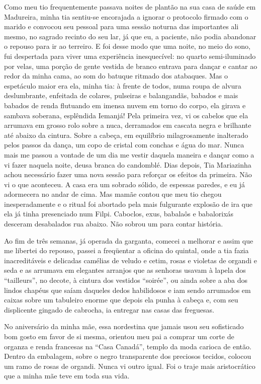 Como meu tio frequentemente passava noites de plantão na sua casa de saúde em Madureira, minha tia sentiu-se encorajada a ignorar o protocolo firmado com o marido e convocou seu pessoal para uma sessão noturna das importantes ali mesmo, no sagrado recinto do seu lar, já que eu, a paciente, não podia abandonar o repouso para ir ao terreiro.
E foi desse modo que uma noite, no meio do sono, fui despertada para viver uma experiência inesquecível: no quarto semi-iluminado por velas, uma porção de gente vestida de branco entrava para dançar e cantar ao redor da minha cama, ao som do batuque ritmado dos atabaques.
Mas o espetáculo maior era ela, minha tia: à frente de todos, numa roupa de alvura deslumbrante, enfeitada de colares, pulseiras e balangandãs, babados e mais babados de renda flutuando em imensa nuvem em torno do corpo, ela girava e sambava soberana, esplêndida Iemanjá!
Pela primeira vez, vi os cabelos que ela arrumava em grosso rolo sobre a nuca, derramados em cascata negra e brilhante até abaixo da cintura.
Sobre a cabeça, em equilíbrio milagrosamente inalterado pelos passos da dança, um copo de cristal com conchas e água do mar.
 Nunca mais me passou a vontade de um dia me vestir daquela maneira e dançar como a vi fazer naquela noite, deusa branca do candomblé.
Dias depois, Tia Mariazinha achou necessário fazer uma nova sessão para reforçar os efeitos da primeira.
Não vi o que aconteceu.
A casa era um sobrado sólido, de espessas paredes, e eu já adormecera no andar de cima.
Mas mamãe contou que meu tio chegou inesperadamente e o ritual foi abortado pela mais fulgurante explosão de ira que ela já tinha presenciado num Filpi.
Caboclos, exus, babalaôs e babalorixás desceram desabalados rua abaixo. Não sobrou um para contar história.

Ao fim de três semanas, já operada da garganta, comecei a melhorar e assim que me libertei do repouso, passei a freqüentar a oficina do quintal, onde a tia fazia inacreditáveis e delicadas camélias de veludo e cetim, rosas e violetas de organdi e seda e as arrumava em elegantes arranjos que as senhoras usavam à lapela dos ``tailleurs'', no decote, à cintura dos vestidos ``soirée'', ou ainda sobre a aba dos lindos chapéus que saíam daqueles dedos habilidosos e iam sendo arrumados em caixas sobre um tabuleiro enorme que depois ela punha à cabeça e, com seu displicente gingado de cabrocha, ia entregar nas casas das freguesas.

No aniversário da minha mãe, essa nordestina que jamais usou seu sofisticado bom gosto em favor de si mesma, orientou meu pai a comprar um corte de organza e renda francesas na ``Casa Canadá'', templo da moda carioca de então.
Dentro da embalagem, sobre o negro transparente dos preciosos tecidos, colocou um ramo de rosas de organdi.
Nunca vi outro igual.
Foi o traje mais aristocrático que a minha mãe teve em toda sua vida.

